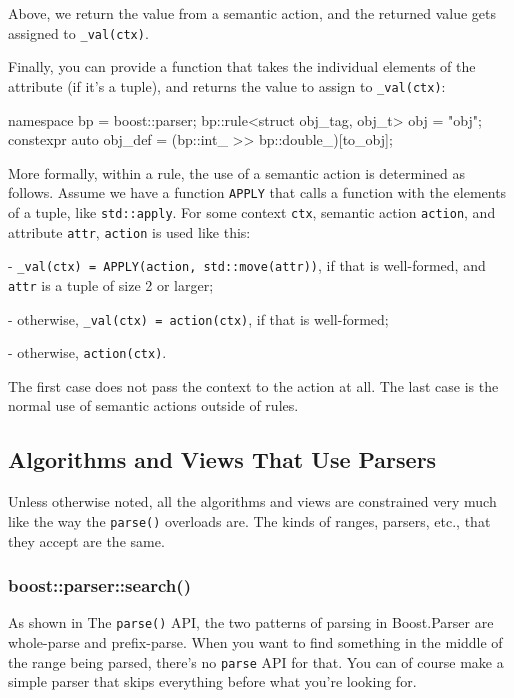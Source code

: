 Above, we return the value from a semantic action, and the returned value gets assigned to \texttt{\_val(ctx)}.

Finally, you can provide a function that takes the individual elements of the attribute (if it's a tuple), and returns the value to assign to \texttt{\_val(ctx)}:

\begin{code}
namespace bp = boost::parser;
bp::rule<struct obj_tag, obj_t> obj = "obj";
constexpr auto obj_def = (bp::int_ >> bp::double_)[to_obj];
\end{code}

More formally, within a rule, the use of a semantic action is determined as follows. Assume we have a function \texttt{APPLY} that calls a function with the elements of a tuple, like \texttt{std::apply}. For some context \texttt{ctx}, semantic action \texttt{action}, and attribute \texttt{attr}, \texttt{action} is used like this:

- \texttt{\_val(ctx) = APPLY(action, std::move(attr))}, if that is well-formed, and \texttt{attr} is a tuple of size 2 or larger;

- otherwise, \texttt{\_val(ctx) = action(ctx)}, if that is well-formed;

- otherwise, \texttt{action(ctx)}.

The first case does not pass the context to the action at all. The last case is the normal use of semantic actions outside of rules.

\subsection{Algorithms and Views That Use Parsers}

Unless otherwise noted, all the algorithms and views are constrained very much like the way the \texttt{parse()} overloads are. The kinds of ranges, parsers, etc., that they accept are the same.

\label{tutorial_split_005.html}{}

\subsubsection{boost::parser::search()}

As shown in The \texttt{parse()} API, the two patterns of parsing in Boost.Parser are whole-parse and prefix-parse. When you want to find something in the middle of the range being parsed, there's no \texttt{parse} API for that. You can of course make a simple parser that skips everything before what you're looking for.

